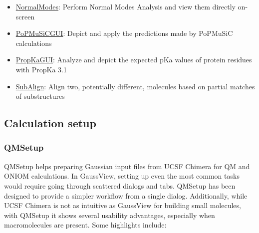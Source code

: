\begin{itemize}
\begin{itemize}
	\item \uline{NormalModes}: Perform Normal Modes Analysis and view them directly on-screen

	\item \uline{PoPMuSiCGUI}: Depict and apply the predictions made by PoPMuSiC calculations

	\item \uline{PropKaGUI}: Analyze and depict the expected pKa values of protein residues with PropKa 3.1

	\item \uline{SubAlign}: Align two, potentially different, molecules based on partial matches of substructures
\end{itemize}
\end{itemize}

\subsection{Calculation setup}
\subsubsection{QMSetup}
QMSetup helps preparing Gaussian input files from UCSF Chimera for QM and ONIOM calculations. In GaussView, setting up even the most common tasks would require going through scattered dialogs and tabs. QMSetup has been designed to provide a simpler workflow from a single dialog. Additionally, while UCSF Chimera is not as intuitive as GaussView for building small molecules, with QMSetup it shows several usability advantages, especially when macromolecules are present. Some highlights include:

